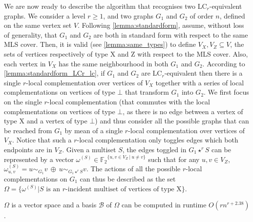 \documentclass[a4paper,UKenglish,cleveref,autoref,thm-restate]{arxiv}
\newcommand{\se}{\subseteq}
\newcommand{\gs}{\geqslant}
\begin{document}
We are now ready to describe the algorithm that recognises two LC$_r$-equivalent graphs. We consider a level $r \gs 1$, and two graphs $G_1$ and $G_2$ of order $n$, defined on the same vertex set $V$. Following \cref{lemma:standardform}, assume, without loss of generality, that $G_1$ and $G_2$ are both in standard form with respect to the same MLS cover. Then, it is valid (see \cref{lemma:same_types}) to define $V_X, V_Z \se V$, the sets of vertices respectively of type X and Z with respect to the MLS cover. Also, each vertex in $V_X$ has the same neighbourhood in both $G_1$ and $G_2$. According to \cref{lemma:standardform_LCr_lc}, if $G_1$ and $G_2$ are LC$_r$-equivalent then there is a single $r$-local complementation over vertices of $V_X$ together with a series of local complementations on vertices of type $\bot$ that transform $G_1$ into $G_2$. We first focus on the single $r$-local complementation (that commutes with the local complementations on vertices of type $\bot$, as there is no edge between a vertex of type X and a vertex of type $\bot$) and thus consider all the possible graphs that can be reached from $G_1$ by mean of a single $r$-local complementation over vertices of $V_X$. 
Notice that such a $r$-local complementation only toggles edges which both endpoints are in $V_Z$. Given a multiset $S$, the edges toggled in $G_1\star^r S$ can be represented by a vector $\omega^{(S)}\in {{\mathbb F}_2}^{\{u,v \in V_Z ~|~ u \neq v\}}$ such that for any $u,v \in V_Z$, $\omega^{(S)}_{u,v} = u\sim_{G_1} v ~\oplus~ u\sim_{G_1\star^r S} v$. The actions of all the possible $r$-local complementations on $G_1$ can thus be described as the set $\Omega =\{\omega^{(S)}  |  \text{$S$ is an $r$-incident multiset of vertices of type X}\}$. 


\begin{lemma} \label{lemma:omega}
    $\Omega$ is a vector space and a basis $\mathcal B$ of $\Omega$ can be computed in runtime $O(r n^{r+2.38})$.
\end{lemma}
\end{document}
